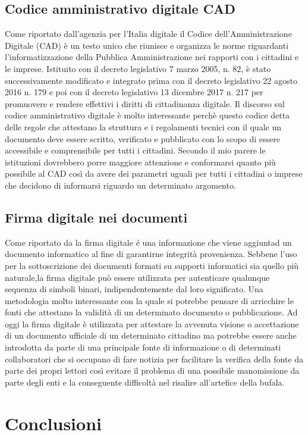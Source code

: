 \documentclass{article}
\begin{document}
\subsection{Codice amministrativo digitale CAD}
Come riportato dall'agenzia per l'Italia digitale \cite{giacalone2007normativa}
il Codice dell'Amministrazione Digitale (CAD) è un testo unico che riunisce e organizza le norme riguardanti l'informatizzazione della Pubblica Amministrazione nei rapporti con i cittadini e le imprese. Istituito con il decreto legislativo 7 marzo 2005, n. 82, è stato successivamente modificato e integrato prima con il decreto legislativo 22 agosto 2016 n. 179 e poi con il decreto legislativo 13 dicembre 2017 n. 217 per promuovere e rendere effettivi i diritti di cittadinanza digitale.
Il discorso sul codice amministrativo digitale è molto interessante perchè questo codice detta delle regole che attestano la struttura e i regolamenti tecnici con il quale un documento deve essere scritto, verificato e pubblicato con lo scopo di essere accessibile e comprensibile per tutti i cittadini.
Secondo il mio parere le istituzioni dovrebbero porre maggiore attenzione e conformarsi quanto più possibile al CAD così da avere dei parametri uguali per tutti i cittadini o imprese che decidono di informarsi riguardo un determinato argomento.

\subsection{Firma digitale nei documenti}
Come riportato da \cite{terranova1998firma} la firma digitale é una informazione che viene aggiuntad un documento informatico al fine di garantirne integrità provenienza. Sebbene l'uso per la sottoscrizione dei documenti formati su supporti informatici sia quello più naturale,la firma digitale può essere utilizzata per autenticare qualunque sequenza di simboli binari, indipendentemente dal loro significato.
Una metodologia molto interessante con la quale si potrebbe pensare di arricchire le fonti che attestano la validità di un determinato documento o pubblicazione.
Ad oggi la firma digitale è utilizzata per attestare la avvenuta visione o accettazione di un documento ufficiale di un determinato cittadino ma potrebbe essere anche introdotta da parte di una principale fonte di informazione o di determinati collaboratori che si occupano di fare notizia per facilitare la verifica della fonte da parte dei propri lettori così evitare il problema di una possibile manomissione da parte degli enti e la conseguente difficoltà nel risalire all'artefice della bufala.
\section{Conclusioni}
\printindex


\end{document}
